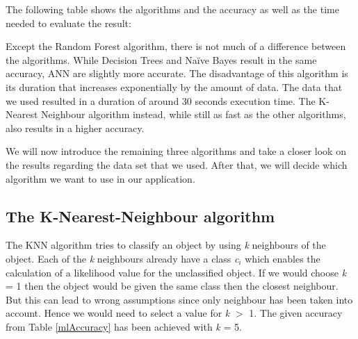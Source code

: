 The following table shows the algorithms and the accuracy as well as the time needed to evaluate the result:

\begin{table}[!htb]
\centering
{}
\caption{Accuracy of different Machine Learning algorithms}
\label{mlAccuracy}
\end{table}

Except the Random Forest algorithm, there is not much of a difference between the algorithms. While Decision Trees and Na{\"i}ve Bayes result in the same accuracy, ANN are slightly more accurate. The disadvantage of this algorithm is its duration that increases exponentially by the amount of data. The data that we used resulted in a duration of around 30 seconds execution time. The K-Nearest Neighbour algorithm instead, while still as fast as the other algorithms, also results in a higher accuracy.

We will now introduce the remaining three algorithms and take a closer look on the results regarding the data set that we used. After that, we will decide which algorithm we want to use in our application.

\subsection{The K-Nearest-Neighbour algorithm}
\label{sec4.2.1}
The KNN algorithm tries to classify an object by using \emph{k} neighbours of the object. Each of the \emph{k} neighbours already have a class \emph{c$_i$} which enables the calculation of a likelihood value for the unclassified object.
If we would choose \emph{k} = 1 then the object would be given the same class then the closest neighbour. But this can lead to wrong assumptions since only neighbour has been taken into account. Hence we would need to select a value for \emph{k} $>$ 1. The given accuracy from Table \ref{mlAccuracy} has been achieved with \emph{k} = 5.

